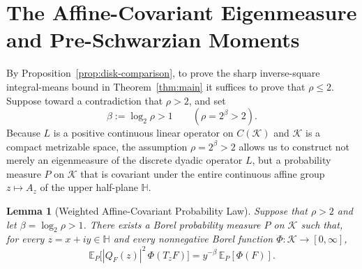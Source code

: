 \documentclass[12pt]{article}
\def\H{\mathbb{H}}
\def\K{\mathcal{K}}
\def\E{\mathbb{E}}
\newtheorem{lemma}[thm]{Lemma}
\theoremstyle{definition}
\numberwithin{equation}{section}
\begin{document}
\section{The Affine-Covariant Eigenmeasure and Pre-Schwarzian Moments}

By Proposition~\ref{prop:disk-comparison}, to prove the sharp inverse-square integral-means bound in Theorem~\ref{thm:main} it suffices to prove that $\rho \le 2$. Suppose toward a contradiction that $\rho > 2$, and set
\begin{equation}\label{eq:beta-def}
  \beta := \log_2 \rho > 1 \qquad (\rho = 2^\beta > 2).
\end{equation}
Because $L$ is a positive continuous linear operator on $C(\K)$ and $\K$ is a compact metrizable space, the assumption $\rho = 2^\beta > 2$ allows us to construct not merely an eigenmeasure of the discrete dyadic operator $L$, but a probability measure $P$ on $\K$ that is covariant under the entire continuous affine group $z \mapsto A_z$ of the upper half-plane $\H$.

\begin{lemma}[Weighted Affine-Covariant Probability Law]\label{lem:weighted-covariance}
Suppose that $\rho > 2$ and let $\beta = \log_2 \rho > 1$. There exists a Borel probability measure $P$ on $\K$ such that, for every $z = x+iy \in \H$ and every nonnegative Borel function $\Phi : \K \to [0, \infty]$,
\begin{equation}\label{eq:weighted-covariance}
  \E_P\Big[|Q_F(z)|^2 \, \Phi(T_z F)\Big] = y^{-\beta} \, \E_P[\Phi(F)].
\end{equation}
\end{lemma}
\end{document}

